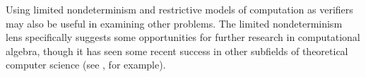 Using limited nondeterminism and restrictive models of computation as verifiers may also be useful in examining other problems.
The limited nondeterminism lens specifically suggests some opportunities for further research in computational algebra, though it has seen some recent success in other subfields of theoretical computer science (see \autocite{gottlob13}, for example).
